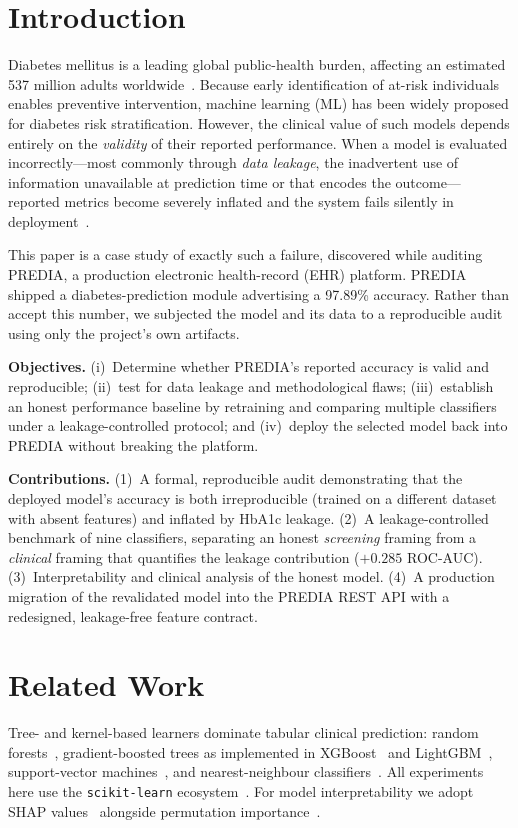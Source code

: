 \documentclass[conference]{IEEEtran}
\begin{document}
\section{Introduction}
Diabetes mellitus is a leading global public-health burden, affecting an
estimated 537 million adults worldwide~\cite{idf2021atlas}. Because early
identification of at-risk individuals enables preventive intervention, machine
learning (ML) has been widely proposed for diabetes risk stratification.
However, the clinical value of such models depends entirely on the
\emph{validity} of their reported performance. When a model is evaluated
incorrectly---most commonly through \emph{data leakage}, the inadvertent use of
information unavailable at prediction time or that encodes the
outcome---reported metrics become severely inflated and the system fails
silently in deployment~\cite{kaufman2012leakage,kapoor2023leakage}.

This paper is a case study of exactly such a failure, discovered while auditing
PREDIA, a production electronic health-record (EHR) platform. PREDIA shipped a
diabetes-prediction module advertising a 97.89\% accuracy. Rather than accept
this number, we subjected the model and its data to a reproducible audit using
only the project's own artifacts.

\textbf{Objectives.} (i)~Determine whether PREDIA's reported accuracy is valid
and reproducible; (ii)~test for data leakage and methodological flaws;
(iii)~establish an honest performance baseline by retraining and comparing
multiple classifiers under a leakage-controlled protocol; and (iv)~deploy the
selected model back into PREDIA without breaking the platform.

\textbf{Contributions.} (1)~A formal, reproducible audit demonstrating that the
deployed model's accuracy is both irreproducible (trained on a different dataset
with absent features) and inflated by HbA1c leakage. (2)~A leakage-controlled
benchmark of nine classifiers, separating an honest \emph{screening} framing
from a \emph{clinical} framing that quantifies the leakage contribution
($+0.285$ ROC-AUC). (3)~Interpretability and clinical analysis of the honest
model. (4)~A production migration of the revalidated model into the PREDIA REST
API with a redesigned, leakage-free feature contract.

\section{Related Work}
Tree- and kernel-based learners dominate tabular clinical prediction: random
forests~\cite{breiman2001random}, gradient-boosted trees as implemented in
XGBoost~\cite{chen2016xgboost} and LightGBM~\cite{ke2017lightgbm}, support-vector
machines~\cite{cortes1995svm}, and nearest-neighbour
classifiers~\cite{cover1967knn}. All experiments here use the
\texttt{scikit-learn} ecosystem~\cite{pedregosa2011scikit}. For model
interpretability we adopt SHAP values~\cite{lundberg2017shap} alongside
permutation importance~\cite{breiman2001random}.
\end{document}
